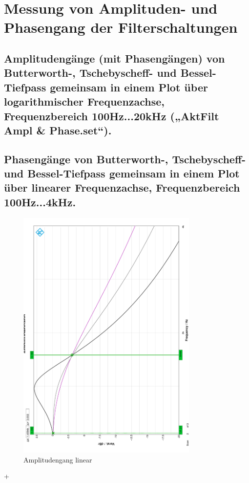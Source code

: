 \section{ Messung von Amplituden- und Phasengang der Filterschaltungen }









\subsection{Amplitudengänge (mit Phasengängen) von Butterworth-, Tschebyscheff- und Bessel-Tiefpass gemeinsam in einem Plot über logarithmischer Frequenzachse, Frequenzbereich 100Hz...20kHz („AktFilt Ampl & Phase.set“).}




\subsection{Phasengänge von Butterworth-, Tschebyscheff- und Bessel-Tiefpass gemeinsam in einem Plot über linearer Frequenzachse, Frequenzbereich 100Hz...4kHz. }


\begin{figure}[H]
    \begin{center}
        \includegraphics[width=0.8\textwidth, angle =-90]{img/3.2 Amplitudengang linear.png}
        \caption{Amplitudengang linear}
        \label{fig:A1_label}
    \end{center}
\end{figure}
+

